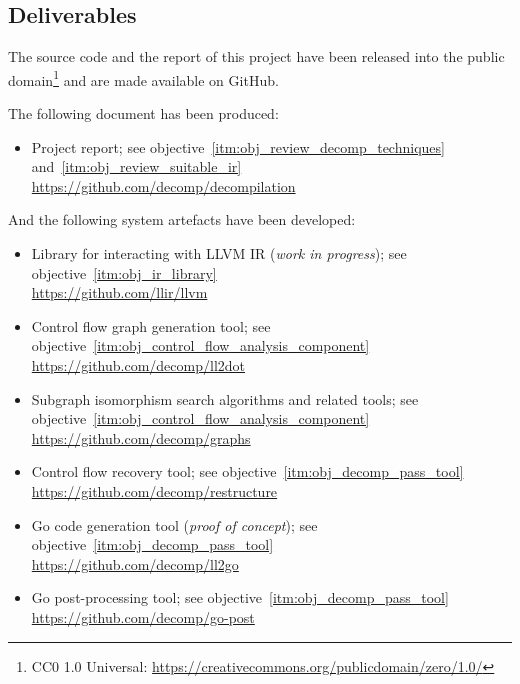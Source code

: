 
\subsection{Deliverables}
\label{sec:intro_deliverables}

The source code and the report of this project have been released into the public domain\footnote{CC0 1.0 Universal: \url{https://creativecommons.org/publicdomain/zero/1.0/}} and are made available on GitHub.

The following document has been produced:

\begin{itemize}
	\item Project report; see objective~\ref{itm:obj_review_decomp_techniques} and~\ref{itm:obj_review_suitable_ir} \\ \url{https://github.com/decomp/decompilation}
\end{itemize}

And the following system artefacts have been developed:

\begin{itemize}
	\item Library for interacting with LLVM IR (\textit{work in progress}); see objective~\ref{itm:obj_ir_library} \\ \url{https://github.com/llir/llvm}
	\item Control flow graph generation tool; see objective~\ref{itm:obj_control_flow_analysis_component} \\ \url{https://github.com/decomp/ll2dot}
	\item Subgraph isomorphism search algorithms and related tools; see objective~\ref{itm:obj_control_flow_analysis_component} \\ \url{https://github.com/decomp/graphs}
	\item Control flow recovery tool; see objective~\ref{itm:obj_decomp_pass_tool} \\ \url{https://github.com/decomp/restructure}
	\item Go code generation tool (\textit{proof of concept}); see objective~\ref{itm:obj_decomp_pass_tool} \\ \url{https://github.com/decomp/ll2go}
	\item Go post-processing tool; see objective~\ref{itm:obj_decomp_pass_tool} \\ \url{https://github.com/decomp/go-post}
\end{itemize}
